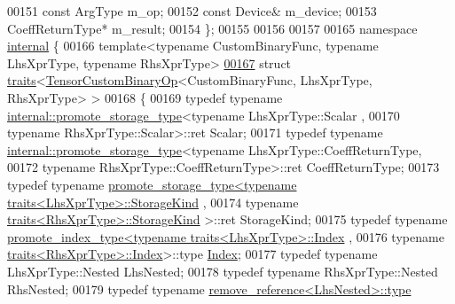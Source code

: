 \begin{DoxyCode}
00151   \textcolor{keyword}{const} ArgType m\_op;
00152   \textcolor{keyword}{const} Device& m\_device;
00153   CoeffReturnType* m\_result;
00154 \};
00155 
00156 
00157 
00165 \textcolor{keyword}{namespace }\hyperlink{namespaceinternal}{internal} \{
00166 \textcolor{keyword}{template}<\textcolor{keyword}{typename} CustomBinaryFunc, \textcolor{keyword}{typename} LhsXprType, \textcolor{keyword}{typename} RhsXprType>
\hyperlink{struct_eigen_1_1internal_1_1traits_3_01_tensor_custom_binary_op_3_01_custom_binary_func_00_01_lh13ec16c8467537dd695eeaba8e396b16}{00167} \textcolor{keyword}{struct }\hyperlink{struct_eigen_1_1internal_1_1traits}{traits}<\hyperlink{class_eigen_1_1_tensor_custom_binary_op}{TensorCustomBinaryOp}<CustomBinaryFunc, LhsXprType, RhsXprType> >
00168 \{
00169   \textcolor{keyword}{typedef} \textcolor{keyword}{typename} \hyperlink{struct_eigen_1_1internal_1_1promote__storage__type}{internal::promote\_storage\_type}<\textcolor{keyword}{typename} LhsXprType::Scalar
      ,
00170                                                   \textcolor{keyword}{typename} RhsXprType::Scalar>::ret Scalar;
00171   \textcolor{keyword}{typedef} \textcolor{keyword}{typename} \hyperlink{struct_eigen_1_1internal_1_1promote__storage__type}{internal::promote\_storage\_type}<\textcolor{keyword}{typename} 
      LhsXprType::CoeffReturnType,
00172                                                   \textcolor{keyword}{typename} RhsXprType::CoeffReturnType>::ret 
      CoeffReturnType;
00173   \textcolor{keyword}{typedef} \textcolor{keyword}{typename} \hyperlink{struct_eigen_1_1internal_1_1promote__storage__type}{promote\_storage\_type<typename traits<LhsXprType>::StorageKind}
      ,
00174                                         \textcolor{keyword}{typename} \hyperlink{struct_eigen_1_1internal_1_1traits}{traits<RhsXprType>::StorageKind}
      >::ret StorageKind;
00175   \textcolor{keyword}{typedef} \textcolor{keyword}{typename} \hyperlink{struct_eigen_1_1internal_1_1promote__index__type}{promote\_index\_type<typename traits<LhsXprType>::Index}
      ,
00176                                       \textcolor{keyword}{typename} \hyperlink{struct_eigen_1_1internal_1_1traits}{traits<RhsXprType>::Index}>::type 
      \hyperlink{namespace_eigen_a62e77e0933482dafde8fe197d9a2cfde}{Index};
00177   \textcolor{keyword}{typedef} \textcolor{keyword}{typename} LhsXprType::Nested LhsNested;
00178   \textcolor{keyword}{typedef} \textcolor{keyword}{typename} RhsXprType::Nested RhsNested;
00179   \textcolor{keyword}{typedef} \textcolor{keyword}{typename} \hyperlink{group___sparse_core___module}{remove\_reference<LhsNested>::type} 

\end{DoxyCode}
